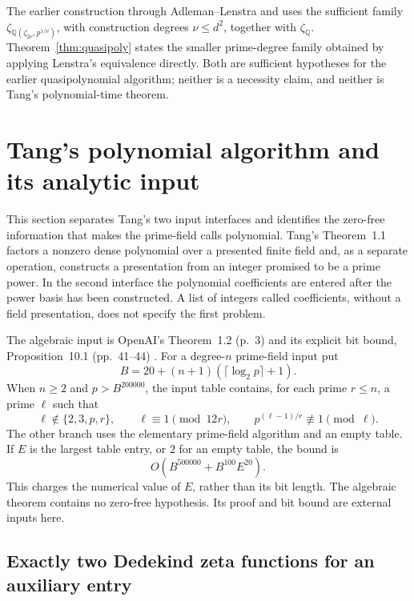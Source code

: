 \documentclass[11pt]{article}
\newcommand{\Q}{\mathbb Q}
\theoremstyle{definition}
\theoremstyle{remark}
\begin{document}
The earlier construction through Adleman--Lenstra and
\citet[Theorem~2, printed p.~7]{BGL2001} uses the sufficient
family $\zeta_{\Q(\zeta_{2\nu},p^{1/\nu})}$, with
construction degrees $\nu\leq d^2$, together with
$\zeta_{\Q}$.  Theorem~\ref{thm:quasipoly} states
the smaller prime-degree family obtained by applying
Lenstra's equivalence directly.  Both are sufficient
hypotheses for the earlier quasipolynomial algorithm;
neither is a necessity claim, and neither is Tang's
polynomial-time theorem.


\section{Tang's polynomial algorithm and its analytic input}
\label{sec:tang}

This section separates Tang's two input interfaces and identifies the
zero-free information that makes the prime-field calls polynomial.
Tang's Theorem~1.1 \cite[pp.~1--2]{Tang2026} factors a nonzero dense
polynomial over a presented finite field and, as a separate operation,
constructs a presentation from an integer promised to be a prime power.
In the second interface the polynomial coefficients are entered after
the power basis has been constructed. A list of integers called
coefficients, without a field presentation, does not specify the first
problem.

The algebraic input is OpenAI's Theorem~1.2 (p.~3) and its explicit bit
bound, Proposition~10.1 (pp.~41--44) \cite{OpenAI2026}. For a degree-$n$ prime-field input put
\[
 B=20+(n+1)(\lceil\log_2p\rceil+1).
\]
When $n\geq2$ and $p>B^{200000}$, the input table contains, for each
prime $r\leq n$, a prime $\ell$ such that
\begin{equation}\label{eq:tangaux}
 \ell\notin\{2,3,p,r\},\qquad
 \ell\equiv1\pmod{12r},\qquad
 p^{(\ell-1)/r}\not\equiv1\pmod\ell.
\end{equation}
The other branch uses the elementary prime-field algorithm and an
empty table. If $E$ is the largest table entry, or $2$ for an empty
table, the bound is
\begin{equation}\label{eq:tangbit}
 O(B^{500000}+B^{100}E^{20}).
\end{equation}
This charges the numerical value of $E$, rather than its bit length.
The algebraic theorem contains no zero-free hypothesis. Its proof and
bit bound are external inputs here.

\subsection{Exactly two Dedekind zeta functions for an auxiliary entry}
\end{document}
